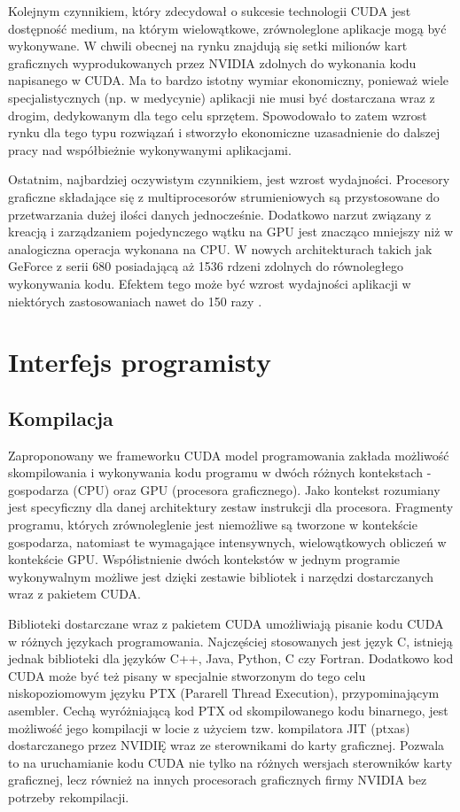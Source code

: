 Kolejnym czynnikiem, który zdecydował o sukcesie technologii CUDA jest
dostępność medium, na którym wielowątkowe, zrównoleglone aplikacje mogą być
wykonywane. W chwili obecnej na rynku znajdują się setki milionów kart
graficznych wyprodukowanych przez NVIDIA zdolnych do wykonania kodu napisanego w
CUDA. Ma to bardzo istotny wymiar ekonomiczny, ponieważ wiele specjalistycznych
(np. w medycynie) aplikacji nie musi być dostarczana wraz z drogim,
	dedykowanym dla tego celu sprzętem. Spowodowało to zatem wzrost rynku dla
	tego typu rozwiązań i stworzyło ekonomiczne uzasadnienie do dalszej pracy
	nad współbieżnie wykonywanymi aplikacjami.

Ostatnim, najbardziej oczywistym czynnikiem, jest wzrost wydajności. Procesory
graficzne składające się z multiprocesorów strumieniowych są przystosowane do
przetwarzania dużej ilości danych jednocześnie. Dodatkowo narzut związany z
kreacją i zarządzaniem pojedynczego wątku na GPU jest znacząco mniejszy niż w
analogiczna operacja wykonana na CPU.  W nowych architekturach takich jak
GeForce z serii 680 posiadającą aż 1536 rdzeni zdolnych do równoległego
wykonywania kodu.  Efektem tego może być wzrost wydajności aplikacji w
niektórych zastosowaniach nawet do 150 razy \cite{prez}.

\section{Interfejs programisty}

\subsection{Kompilacja}

Zaproponowany we frameworku CUDA model programowania zakłada możliwość
skompilowania i wykonywania kodu programu w dwóch różnych kontekstach -
gospodarza (CPU) oraz GPU (procesora graficznego)\cite{Nvi11b}. Jako kontekst rozumiany jest
specyficzny dla danej architektury zestaw instrukcji dla procesora. Fragmenty
programu, których zrównoleglenie jest niemożliwe są tworzone w kontekście
gospodarza,
	natomiast te wymagające intensywnych, wielowątkowych obliczeń w kontekście
	GPU.  Współistnienie dwóch kontekstów w jednym programie wykonywalnym
	możliwe jest dzięki zestawie bibliotek i narzędzi dostarczanych wraz z
	pakietem CUDA.

Biblioteki dostarczane wraz z pakietem CUDA umożliwiają pisanie kodu CUDA w różnych
językach programowania. Najczęściej stosowanych jest język C, istnieją jednak biblioteki
dla języków C++, Java, Python, C czy Fortran. Dodatkowo kod CUDA może być też pisany w specjalnie stworzonym do tego celu
niskopoziomowym języku PTX (Pararell Thread Execution), przypominającym asembler.
Cechą wyróżniającą kod PTX od skompilowanego kodu binarnego, jest możliwość jego
kompilacji w locie z użyciem tzw. kompilatora JIT (ptxas) dostarczanego przez
NVIDIĘ wraz ze sterownikami do karty graficznej. Pozwala to na uruchamianie kodu
CUDA nie tylko na różnych wersjach sterowników karty graficznej, lecz również na
innych procesorach graficznych firmy NVIDIA bez potrzeby rekompilacji.

